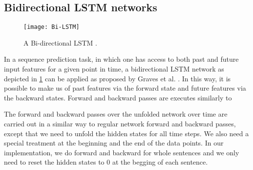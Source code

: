 \begin{comment}
\begin{equation} \label{eq:f_t}
	f_t = \sigma(W_f \cdot [h_{t-1},x_t] + b_f)
\end{equation}

\begin{equation} \label{eq:i_t}
i_t = \sigma(W_i \cdot [h_{t-1},x_t] + b_i)
\end{equation}

\begin{equation} \label{eq:hatC_t}
\hat{C}_t = \tanh(W_C \cdot [h_{t-1},x_t] + b_C)
\end{equation}

\begin{equation} \label{eq:C_t}
C_t = f_t \cdot C_{t-1} + i_t \cdot \hat{C}_t
\end{equation}

\begin{equation} \label{eq:o_t}
o_t = \sigma (W_o [h_{t-1}, x_t] + b_o)
\end{equation}

\begin{equation} \label{eq:h_t}
h_t = o_t \cdot \tanh(C_t)
\end{equation}
\end{comment}


\subsection{Bidirectional LSTM networks \label{sec:bi-lstm}}
\begin{figure}[h]
  \centering
  \texttt{[image: Bi-LSTM]} \\
  \caption{A Bi-directional LSTM \cite{graves2013speech}.}
  \label{fig:bi-lstm}
\end{figure}
In a sequence prediction task, in which one has access to both past and future input features for a given point in time, a bidirectional LSTM network as depicted in \ref{fig:bi-lstm} can be applied as proposed by Graves et al. \cite{graves2013speech}. In this way, it is possible to make us of past features via the forward state and future features via the backward states. Forward and backward passes are executes similarly to 



The forward and backward passes over the unfolded network over time are carried out in a similar way to regular network forward and backward passes, except that we need to unfold the hidden states for all time steps. We also need a special treatment at the beginning and the end of the data points. In our implementation, we do forward and backward for whole sentences and we only need to reset the hidden states to 0 at the begging of each sentence. 




